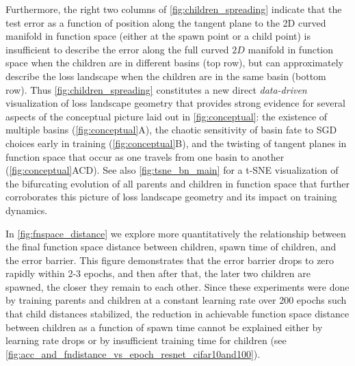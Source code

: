 \documentclass{article}
\begin{document}
Furthermore, the right two columns of \cref{fig:children_spreading} indicate that the test error as a function of position along the tangent plane to the 2D curved manifold in function space (either at the spawn point or a child point) is insufficient to describe the error along the full curved $2D$ manifold in function space when the children are in different basins (top row), but can approximately describe the loss landscape when the children are in the same basin (bottom row).  
Thus \cref{fig:children_spreading} constitutes a new direct \emph{data-driven} visualization of loss landscape geometry that provides strong evidence for several aspects of the conceptual picture laid out in \cref{fig:conceptual}: the existence of multiple basins (\cref{fig:conceptual}A), the chaotic sensitivity of basin fate to SGD choices early in training (\cref{fig:conceptual}B), and the twisting of tangent planes in function space that occur as one travels from one basin to another (\cref{fig:conceptual}ACD). See also \cref{fig:tsne_bn_main} for a t-SNE visualization of the bifurcating evolution of all parents and children in function space that further corroborates this picture of loss landscape geometry and its impact on training dynamics.

In \cref{fig:fnspace_distance} we explore more quantitatively the relationship between the final function space distance between children, spawn time of children, and the error barrier. This figure demonstrates that the error barrier drops to zero rapidly within 2-3 epochs, and then after that, the later two children are spawned, the closer they remain to each other.  Since these experiments were done by training parents and children at a constant learning rate over 200 epochs such that child distances stabilized, the reduction in achievable function space distance between children as a function of spawn time cannot be explained either by learning rate drops or by insufficient training time for children (see \cref{fig:acc_and_fndistance_vs_epoch_resnet_cifar10and100}). 
\end{document}
